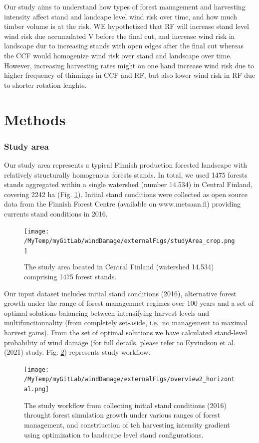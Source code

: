 \documentclass[]{elsarticle} %
\begin{document}
Our study aims to understand how types of forest management and
harvesting intensity affect stand and landcape level wind risk over
time, and how much timber volume is at the risk. WE hypothetized that RF
will increase stand level wind risk due accumulated V before the final
cut, and increase wind risk in landscape dur to increasing stands with
open edges after the final cut whereas the CCF would homogenize wind
risk over stand and landscape over time. However, increasing harvesting
rates might on one hand increase wind risk due to higher frequency of
thinnings in CCF and RF, but also lower wind risk in RF due to shorter
rotation lenghts.

\section{Methods}\label{methods}

\subsubsection{Study area}\label{study-area}

Our study area represents a typical Finnish production forested
landscape with relatively structurally homogenous forests stands. In
total, we used 1475 forests stands aggregated within a single watershed
(number 14.534) in Central Finland, covering 2242 ha (Fig.
\ref{study_area}). Initial stand conditions were collected as open
source data from the Finnish Forest Centre (available on www.metsaan.fi)
providing currents stand conditions in 2016.

\begin{figure}
\centering
\texttt{[image: /MyTemp/myGitLab/windDamage/externalFigs/studyArea\_crop.png]}
\caption{The study area located in Central Finland (watershed 14.534)
comprising 1475 forest stands.\label{study_area}}
\end{figure}

Our input dataset includes initial stand conditions (2016), alternative
forest growth under the range of forest managemnet regimes over 100
years and a set of optimal solutions balancing between intensifying
harvest levels and multifunctionnality (from completely set-aside,
i.e.~no management to maximal harvest gains). From the set of optimal
solutions we have calculated stand-level probability of wind damage (for
full details, please refer to Eyvindson et al. (2021) study. Fig.
\ref{workflow}) represents study workflow.

\begin{figure}
\centering
\texttt{[image: /MyTemp/myGitLab/windDamage/externalFigs/overview2\_horizontal.png]}
\caption{The study workflow from collecting initial stand conditions
(2016) throught forest simulation growth under various ranges of forest
management, and constriuction of teh harvesting intensity gradient using
optimization to landscape level stand configurations.\label{workflow}}
\end{figure}
\end{document}
